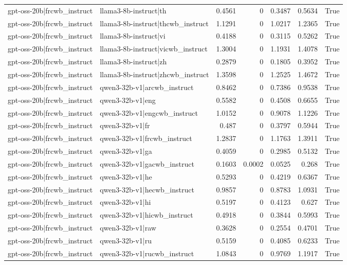 \begin{table}
\begin{tabular}{l l r r r r l}
gpt-oss-20b|frcwb_instruct & llama3-8b-instruct|th & 0.4561 & 0 & 0.3487 & 0.5634 & True \\
gpt-oss-20b|frcwb_instruct & llama3-8b-instruct|thcwb_instruct & 1.1291 & 0 & 1.0217 & 1.2365 & True \\
gpt-oss-20b|frcwb_instruct & llama3-8b-instruct|vi & 0.4188 & 0 & 0.3115 & 0.5262 & True \\
gpt-oss-20b|frcwb_instruct & llama3-8b-instruct|vicwb_instruct & 1.3004 & 0 & 1.1931 & 1.4078 & True \\
gpt-oss-20b|frcwb_instruct & llama3-8b-instruct|zh & 0.2879 & 0 & 0.1805 & 0.3952 & True \\
gpt-oss-20b|frcwb_instruct & llama3-8b-instruct|zhcwb_instruct & 1.3598 & 0 & 1.2525 & 1.4672 & True \\
gpt-oss-20b|frcwb_instruct & qwen3-32b-v1|arcwb_instruct & 0.8462 & 0 & 0.7386 & 0.9538 & True \\
gpt-oss-20b|frcwb_instruct & qwen3-32b-v1|eng & 0.5582 & 0 & 0.4508 & 0.6655 & True \\
gpt-oss-20b|frcwb_instruct & qwen3-32b-v1|engcwb_instruct & 1.0152 & 0 & 0.9078 & 1.1226 & True \\
gpt-oss-20b|frcwb_instruct & qwen3-32b-v1|fr & 0.487 & 0 & 0.3797 & 0.5944 & True \\
gpt-oss-20b|frcwb_instruct & qwen3-32b-v1|frcwb_instruct & 1.2837 & 0 & 1.1763 & 1.3911 & True \\
gpt-oss-20b|frcwb_instruct & qwen3-32b-v1|ga & 0.4059 & 0 & 0.2985 & 0.5132 & True \\
gpt-oss-20b|frcwb_instruct & qwen3-32b-v1|gacwb_instruct & 0.1603 & 0.0002 & 0.0525 & 0.268 & True \\
gpt-oss-20b|frcwb_instruct & qwen3-32b-v1|he & 0.5293 & 0 & 0.4219 & 0.6367 & True \\
gpt-oss-20b|frcwb_instruct & qwen3-32b-v1|hecwb_instruct & 0.9857 & 0 & 0.8783 & 1.0931 & True \\
gpt-oss-20b|frcwb_instruct & qwen3-32b-v1|hi & 0.5197 & 0 & 0.4123 & 0.627 & True \\
gpt-oss-20b|frcwb_instruct & qwen3-32b-v1|hicwb_instruct & 0.4918 & 0 & 0.3844 & 0.5993 & True \\
gpt-oss-20b|frcwb_instruct & qwen3-32b-v1|raw & 0.3628 & 0 & 0.2554 & 0.4701 & True \\
gpt-oss-20b|frcwb_instruct & qwen3-32b-v1|ru & 0.5159 & 0 & 0.4085 & 0.6233 & True \\
gpt-oss-20b|frcwb_instruct & qwen3-32b-v1|rucwb_instruct & 1.0843 & 0 & 0.9769 & 1.1917 & True \\

\end{tabular}
\end{table}
